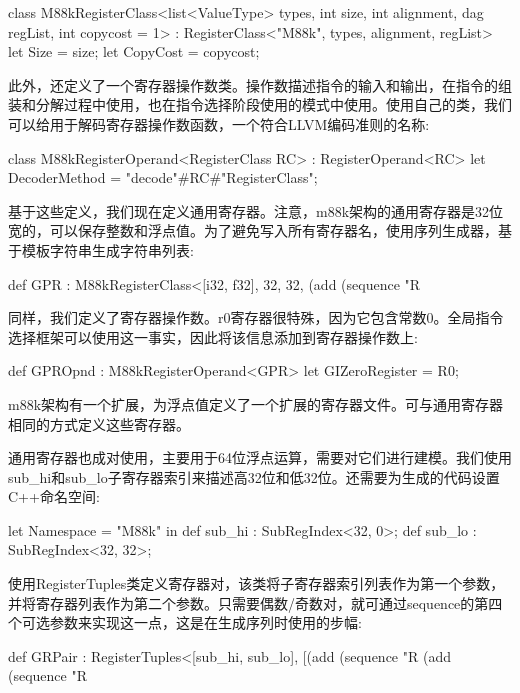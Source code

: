 \begin{cpp}
class M88kRegisterClass<list<ValueType> types, int size,
                        int alignment, dag regList,
                        int copycost = 1>
    : RegisterClass<"M88k", types, alignment, regList> {
    let Size = size;
    let CopyCost = copycost;
}
\end{cpp}

此外，还定义了一个寄存器操作数类。操作数描述指令的输入和输出，在指令的组装和分解过程中使用，也在指令选择阶段使用的模式中使用。使用自己的类，我们可以给用于解码寄存器操作数函数，一个符合LLVM编码准则的名称:

\begin{cpp}
class M88kRegisterOperand<RegisterClass RC>
: RegisterOperand<RC> {
    let DecoderMethod = "decode"#RC#"RegisterClass";
}
\end{cpp}

基于这些定义，我们现在定义通用寄存器。注意，m88k架构的通用寄存器是32位宽的，可以保存整数和浮点值。为了避免写入所有寄存器名，使用序列生成器，基于模板字符串生成字符串列表:

\begin{cpp}
def GPR : M88kRegisterClass<[i32, f32], 32, 32,
                            (add (sequence "R%
\end{cpp}

同样，我们定义了寄存器操作数。r0寄存器很特殊，因为它包含常数0。全局指令选择框架可以使用这一事实，因此将该信息添加到寄存器操作数上:

\begin{cpp}
def GPROpnd : M88kRegisterOperand<GPR> {
    let GIZeroRegister = R0;
}
\end{cpp}

m88k架构有一个扩展，为浮点值定义了一个扩展的寄存器文件。可与通用寄存器相同的方式定义这些寄存器。

通用寄存器也成对使用，主要用于64位浮点运算，需要对它们进行建模。我们使用sub\_hi和sub\_lo子寄存器索引来描述高32位和低32位。还需要为生成的代码设置C++命名空间:

\begin{cpp}
let Namespace = "M88k" in {
    def sub_hi : SubRegIndex<32, 0>;
    def sub_lo : SubRegIndex<32, 32>;
}
\end{cpp}

使用RegisterTuples类定义寄存器对，该类将子寄存器索引列表作为第一个参数，并将寄存器列表作为第二个参数。只需要偶数/奇数对，就可通过sequence的第四个可选参数来实现这一点，这是在生成序列时使用的步幅:

\begin{cpp}
def GRPair : RegisterTuples<[sub_hi, sub_lo],
                            [(add (sequence "R%
                            (add (sequence "R%
\end{cpp}

